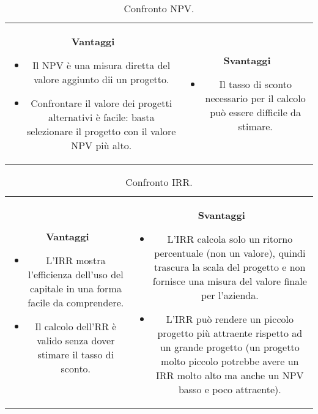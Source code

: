 \documentclass[a4paper,portrait,12pt]{article}
\theoremstyle{definition}
\begin{document}
\begin{table}[h]
\begin{tabular}{cc}
\begin{minipage}[t]{.5\linewidth}
\textbf{Vantaggi}
\begin{itemize}
\item Il NPV è una misura diretta del valore aggiunto dii un progetto.
\item Confrontare il valore dei progetti alternativi è facile: basta selezionare il progetto con il valore NPV più alto.
\end{itemize}
\end{minipage}
&
\begin{minipage}[t]{.5\linewidth}
\textbf{Svantaggi}
\begin{itemize}
\item Il tasso di sconto necessario per il calcolo può essere difficile da stimare.
\end{itemize}
\end{minipage}
\end{tabular}
\caption{Confronto NPV.}
\end{table}

\begin{table}[h]
\begin{tabular}{cc}
\begin{minipage}[t]{.5\linewidth}
\textbf{Vantaggi}
\begin{itemize}
\item L'IRR mostra l'efficienza dell'uso del capitale in una forma facile da comprendere.
\item Il calcolo dell'RR è valido senza dover stimare il tasso di sconto.
\end{itemize}
\end{minipage}
&
\begin{minipage}[t]{.5\linewidth}
\textbf{Svantaggi}
\begin{itemize}
\item L'IRR calcola solo un ritorno percentuale (non un valore), quindi trascura la scala del progetto e non fornisce una misura del valore finale per l'azienda.
\item L'IRR può rendere un piccolo progetto più attraente rispetto ad un grande progetto (un progetto molto piccolo potrebbe avere un IRR molto alto ma anche un NPV basso e poco attraente).
\end{itemize}
\end{minipage}
\end{tabular}
\caption{Confronto IRR.}
\end{table}
\end{document}
